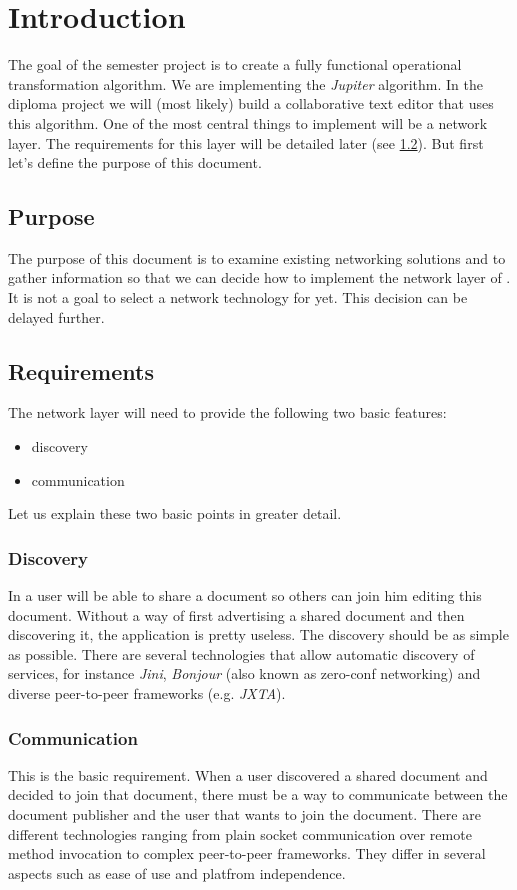 \section{Introduction}
The goal of the semester project is to create a fully functional operational transformation algorithm. We are implementing the \emph{Jupiter} algorithm. In the diploma project we will (most likely) build a collaborative text editor that uses this algorithm. One of the most central things to implement will be a network layer. The requirements for this layer will be detailed later (see \ref{sect:requirements}). But first let's define the purpose of this document.

\subsection{Purpose}
The purpose of this document is to examine existing networking solutions and to gather information so that we can decide how to implement the network layer of \ace. It is not a goal to select a network technology for \ace yet. This decision can be delayed further. 

\subsection{Requirements}
\label{sect:requirements}
The network layer will need to provide the following two basic features:

\begin{itemize}
 \item discovery
 \item communication
\end{itemize}

Let us explain these two basic points in greater detail.

\subsubsection{Discovery}
In \ace a user will be able to share a document so others can join him editing this document. Without a way of first advertising a shared document and then discovering it, the application is pretty useless. The discovery should be as simple as possible. There are several technologies that allow automatic discovery of services, for instance \emph{Jini}, \emph{Bonjour} (also known as zero-conf networking) and diverse peer-to-peer frameworks (e.g. \emph{JXTA}).

\subsubsection{Communication}
This is the basic requirement. When a user discovered a shared document and decided to join that document, there must be a way to communicate between the document publisher and the user that wants to join the document. There are different technologies ranging from plain socket communication over remote method invocation to complex peer-to-peer frameworks. They differ in several aspects such as ease of use and platfrom independence.
